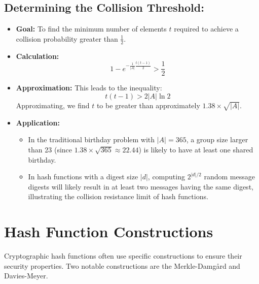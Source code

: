 \documentclass[12pt]{article}
\begin{document}
\subsection*{Determining the Collision Threshold:}
\begin{itemize}
    \item \textbf{Goal:} To find the minimum number of elements \( t \) required to achieve a collision probability greater than \( \frac{1}{2} \).
    \item \textbf{Calculation:} 
    \[
    1 - e^{-\frac{1}{|A|} \frac{t(t-1)}{2}} > \frac{1}{2}
    \]
    \item \textbf{Approximation:} This leads to the inequality:
    \[
    t(t-1) > 2|A| \ln 2
    \]
    Approximating, we find \( t \) to be greater than approximately \( 1.38 \times \sqrt{|A|} \).
    \item \textbf{Application:} 
    \begin{itemize}
        \item In the traditional birthday problem with \( |A|=365 \), a group size larger than 23 (since \( 1.38 \times \sqrt{365} \approx 22.44 \)) is likely to have at least one shared birthday.
        \item In hash functions with a digest size \( |d| \), computing \( 2^{|d|/2} \) random message digests will likely result in at least two messages having the same digest, illustrating the collision resistance limit of hash functions.
    \end{itemize}
\end{itemize}

\section*{Hash Function Constructions}

Cryptographic hash functions often use specific constructions to ensure their security properties. Two notable constructions are the Merkle-Damgård and Davies-Meyer.
\end{document}
